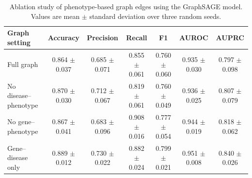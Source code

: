 \begin{table}[htbp]
\centering
\caption{Ablation study of phenotype-based graph edges using the GraphSAGE model. Values are mean $\pm$ standard deviation over three random seeds.}
\label{tab:ablation_results}
\begin{tabular}{lcccccc}
\toprule
Graph setting & Accuracy & Precision & Recall & F1 & AUROC & AUPRC \\
\midrule
Full graph & 0.864 $\pm$ 0.037 & 0.685 $\pm$ 0.071 & 0.855 $\pm$ 0.061 & 0.760 $\pm$ 0.060 & 0.935 $\pm$ 0.030 & 0.797 $\pm$ 0.098 \\
No disease–phenotype & 0.870 $\pm$ 0.030 & 0.712 $\pm$ 0.067 & 0.819 $\pm$ 0.061 & 0.760 $\pm$ 0.049 & 0.936 $\pm$ 0.025 & 0.807 $\pm$ 0.079 \\
No gene–phenotype & 0.867 $\pm$ 0.041 & 0.683 $\pm$ 0.096 & 0.908 $\pm$ 0.016 & 0.777 $\pm$ 0.054 & 0.944 $\pm$ 0.019 & 0.818 $\pm$ 0.062 \\
Gene–disease only & 0.889 $\pm$ 0.012 & 0.730 $\pm$ 0.022 & 0.882 $\pm$ 0.024 & 0.799 $\pm$ 0.021 & 0.951 $\pm$ 0.008 & 0.840 $\pm$ 0.026 \\
\bottomrule
\end{tabular}
\end{table}